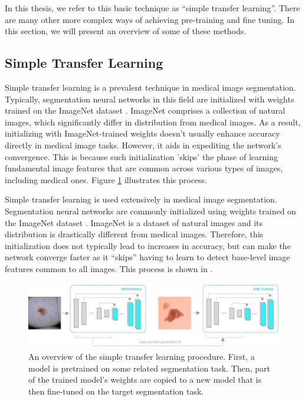 In this thesis, we refer to this basic technique as ``simple transfer learning''. There are many other more complex ways of achieving pre-training and fine tuning. In this section, we will present an overview of some of these methods.

	\subsection{Simple Transfer Learning}
	
	Simple transfer learning is a prevalent technique in medical image segmentation. Typically, segmentation neural networks in this field are initialized with weights trained on the ImageNet dataset \cite{dengImageNetLargescaleHierarchical2009a}. ImageNet comprises a collection of natural images, which significantly differ in distribution from medical images. As a result, initializing with ImageNet-trained weights doesn't usually enhance accuracy directly in medical image tasks. However, it aids in expediting the network's convergence. This is because such initialization 'skips' the phase of learning fundamental image features that are common across various types of images, including medical ones. Figure \ref{fig:stl-diagram} illustrates this process.
	
Simple transfer learning is used extensively in medical image segmentation. Segmentation neural networks are commonly initialized using weights trained on the ImageNet dataset \cite{dengImageNetLargescaleHierarchical2009a}. ImageNet is a dataset of natural images and its distribution is drastically different from medical images. Therefore, this initialization does not typically lead to increases in accuracy, but can make the network converge faster as it ``skips'' having to learn to detect base-level image features common to all images. This process is shown in .

\begin{figure}[h!]
 \centering
 \includegraphics[width=\linewidth]{images/3/simple-transfer-learning-diagram}
 \caption{An overview of the simple transfer learning procedure. First, a model is pretrained on some related segmentation task. Then, part of the trained model's weights are copied to a new model that is then fine-tuned on the target segmentation task.}
 \label{fig:stl-diagram}
\end{figure}

